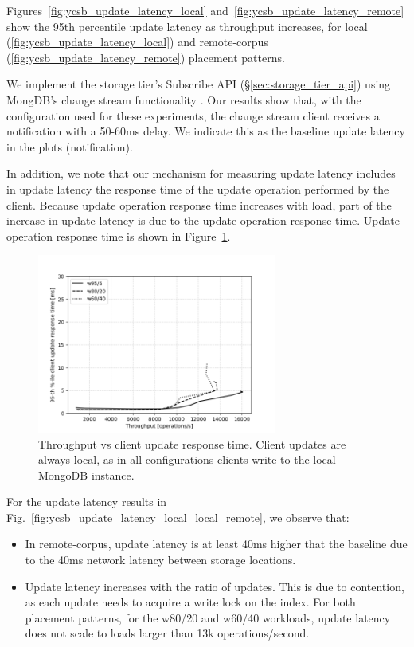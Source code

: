 Figures~\ref{fig:ycsb_update_latency_local} and~\ref{fig:ycsb_update_latency_remote} show the 95th percentile update latency as throughput increases,
for local (\ref{fig:ycsb_update_latency_local}) and remote-corpus (\ref{fig:ycsb_update_latency_remote}) placement patterns.

We implement the storage tier's Subscribe API (\S\ref{sec:storage_tier_api}) using MongDB's change stream functionality \cite{mongo:changestreams}.
Our results show that, with the configuration used for these experiments, the change stream client receives a notification with a 50-60ms delay.
We indicate this as the baseline update latency in the plots (notification).

In addition, we note that our mechanism for measuring update latency includes in update latency
the response time of the update operation performed by the client.
Because update operation response time increases with load, part of the increase in update latency is due to the update operation response time.
Update operation response time is shown in Figure~\ref{fig:ycsb_write_latency}.

\begin{figure}[H]
\centering
  \includegraphics[width=0.7\textwidth]{./figures/evaluation/ycsb_write_latency.png}
  \caption{Throughput vs client update response time. Client updates are always local,
  as in all configurations clients write to the local MongoDB instance.}
  \label{fig:ycsb_write_latency}
\end{figure}

\noindent
For the update latency results in Fig.~\ref{fig:ycsb_update_latency_local_local_remote}, we observe that:
\begin{itemize}
  \item In remote-corpus, update latency is at least 40ms higher that the baseline
  due to the 40ms network latency between storage locations.

  \item Update latency increases with the ratio of updates.
  This is due to contention, as each update needs to acquire a write lock on the index.
  For both placement patterns, for the w80/20 and w60/40 workloads,
  update latency does not scale to loads larger than 13k operations/second.
\end{itemize}

